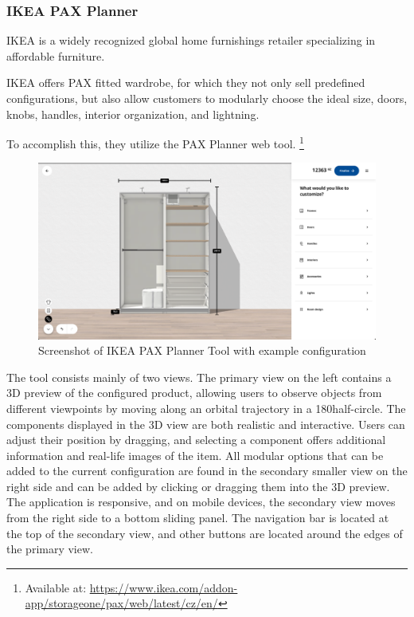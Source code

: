 \subsubsection{IKEA PAX Planner}

IKEA is a widely recognized global home furnishings retailer specializing in affordable furniture. \cite{StatistaIkea}

IKEA offers PAX fitted wardrobe, for which they not only sell predefined configurations, but also allow customers to modularly choose the ideal size, doors, knobs, handles, interior organization, and lightning.

To accomplish this, they utilize the PAX Planner web tool. \footnote{Available at: \url{https://www.ikea.com/addon-app/storageone/pax/web/latest/cz/en/}} 

\begin{figure}[h]
\centering
\includegraphics[width=\textwidth]{images/analysis_ikea-pax.png}
\caption{Screenshot of IKEA PAX Planner Tool with example configuration}
\end{figure}

The tool consists mainly of two views. The primary view on the left contains a 3D preview of the configured product, allowing users to observe objects from different viewpoints by moving along an orbital trajectory in a 180\textdegree half-circle. The components displayed in the 3D view are both realistic and interactive. Users can adjust their position by dragging, and selecting a component offers additional information and real-life images of the item. All modular options that can be added to the current configuration are found in the secondary smaller view on the right side and can be added by clicking or dragging them into the 3D preview. The application is responsive, and on mobile devices, the secondary view moves from the right side to a bottom sliding panel. The navigation bar is located at the top of the secondary view, and other buttons are located around the edges of the primary view.

